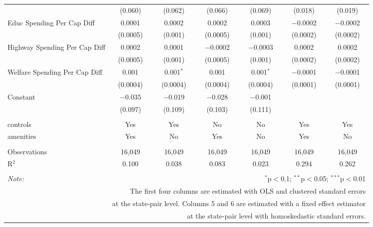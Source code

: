 \begin{table}[!htbp]
\begin{tabular}{@{\extracolsep{5pt}}lcccccc}
  & (0.060) & (0.062) & (0.066) & (0.069) & (0.018) & (0.019) \\ 
  Educ Spending Per Cap Diff & 0.0001 & 0.0002 & 0.0002 & 0.0003 & $-$0.0002 & $-$0.0002 \\ 
  & (0.0005) & (0.001) & (0.0005) & (0.001) & (0.0002) & (0.0002) \\ 
  Highway Spending Per Cap Diff & 0.0002 & 0.0001 & $-$0.0002 & $-$0.0003 & 0.0002 & 0.0002 \\ 
  & (0.0005) & (0.001) & (0.0005) & (0.001) & (0.0002) & (0.0002) \\ 
  Welfare Spending Per Cap Diff & 0.001 & 0.001$^{*}$ & 0.001 & 0.001$^{*}$ & $-$0.0001 & $-$0.0001 \\ 
  & (0.0004) & (0.0004) & (0.0004) & (0.0004) & (0.0001) & (0.0001) \\ 
  Constant & $-$0.035 & $-$0.019 & $-$0.028 & $-$0.001 &  &  \\ 
  & (0.097) & (0.109) & (0.103) & (0.111) &  &  \\ 
 \hline \\[-1.8ex] 
controls & Yes & Yes & No & No & Yes & Yes \\ 
amenities & Yes & No & Yes & No & Yes & No \\ 
\hline \\[-1.8ex] 
Observations & 16,049 & 16,049 & 16,049 & 16,049 & 16,049 & 16,049 \\ 
R$^{2}$ & 0.100 & 0.038 & 0.083 & 0.023 & 0.294 & 0.262 \\ 
\hline 
\hline \\[-1.8ex] 
\textit{Note:}  & \multicolumn{6}{r}{$^{*}$p$<$0.1; $^{**}$p$<$0.05; $^{***}$p$<$0.01} \\ 
 & \multicolumn{6}{r}{The first four columns are estimated with OLS and clustered standard errors} \\ 
 & \multicolumn{6}{r}{at the state-pair level. Columns 5 and 6 are estimated with a fixed effect estimator} \\ 
 & \multicolumn{6}{r}{at the state-pair level with homoskedastic standard errors.} \\ 
\end{tabular} 
\end{table} 
